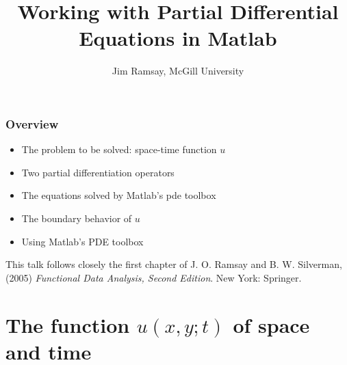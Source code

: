 \documentclass[11pt]{beamer}
\title{Working with Partial Differential Equations in Matlab}
\author{Jim Ramsay, McGill University}
\date{}
\begin{document}

\begin{frame}

\maketitle


\end{frame}


\begin{frame}

\frametitle{Overview}

\begin{itemize}
  \item The problem to be solved:  space-time function $u$
  \item Two partial differentiation operators
  \item The equations solved by Matlab's pde toolbox
  \item The boundary behavior of $u$
  \item Using Matlab's PDE toolbox
\end{itemize}

This talk follows closely the first chapter of J. O. Ramsay and B. W. Silverman, (2005)
\emph{Functional Data Analysis, Second Edition}. New York: Springer.

\end{frame}


\section{The function $u(x,y; t)$ of space and time}
\end{document}
